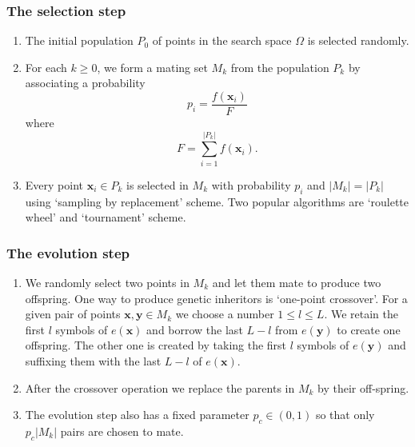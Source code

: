\documentclass{beamer}
\begin{document}
\begin{frame}
\frametitle{The selection step}
\begin{enumerate}
\item The initial population $P_0$ of points in the search space $\Omega$ is 
selected randomly.
\item For each $k \ge 0$, we form a mating set $M_k$ from the population $P_k$
by associating a probability
\begin{equation}\label{e2}
p_i = \frac{f(\bm{x}_i)}{F}
\end{equation}
where
\begin{equation}\label{e3}
F = \sum_{i=1}^{|P_k|} f(\bm{x}_i).
\end{equation}
\item Every point $\bm{x}_i \in P_k$ is selected in $M_k$ with probability $p_i$
and $|M_k| = |P_k|$ using `sampling by replacement' scheme. Two popular 
algorithms are `roulette wheel' and `tournament' scheme.
\end{enumerate}
\end{frame}

\begin{frame}
\frametitle{The evolution step}
\begin{enumerate}
\item We randomly select two points in $M_k$ and let them mate to produce two
offspring. One way to produce genetic inheritors is `one-point crossover'. For
a given pair of points $\bm{x}, \bm{y} \in M_k$ we choose a number $1 \le l \le 
L$. We retain the first $l$ symbols of $e(\bm{x})$ and borrow the last $L-l$ 
from $e(\bm{y})$ to create one offspring. The other one is created by taking the
first $l$ symbols of $e(\bm{y})$ and suffixing them with the last $L-l$ of 
$e(\bm{x})$.
\item After the crossover operation we replace the parents in $M_k$ by their 
off-spring.
\item The evolution step also has a fixed parameter $p_c \in (0, 1)$ so that 
only $p_c|M_k|$ pairs are chosen to mate.
\end{enumerate}
\end{frame}
\end{document}
